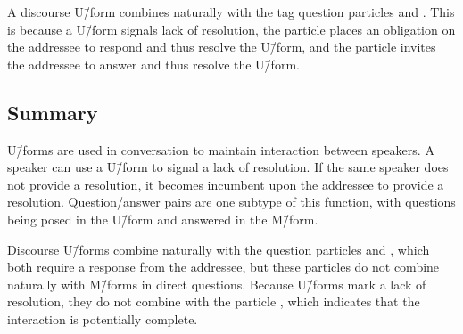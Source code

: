 A discourse U\=/form combines naturally with
the tag question particles  and .
This is because a U\=/form signals lack of resolution,
the particle  places an obligation on the addressee
to respond and thus resolve the U\=/form,
and the particle  invites the addressee to answer
and thus resolve the U\=/form.

\subsection{Summary}
U\=/forms are used in conversation to maintain interaction between speakers.
A speaker can use a U\=/form to signal a lack of resolution.
If the same speaker does not provide a resolution,
it becomes incumbent upon the addressee to provide a resolution.
Question/answer pairs are one subtype of this function,
with questions being posed in the U\=/form and answered in the M\=/form.

Discourse U\=/forms combine naturally with the question particles  and ,
which both require a response from the addressee,
but these particles do not combine naturally with M\=/forms in direct questions.
Because U\=/forms mark a lack of resolution,
they do not combine with the particle ,
which indicates that the interaction is potentially complete.
